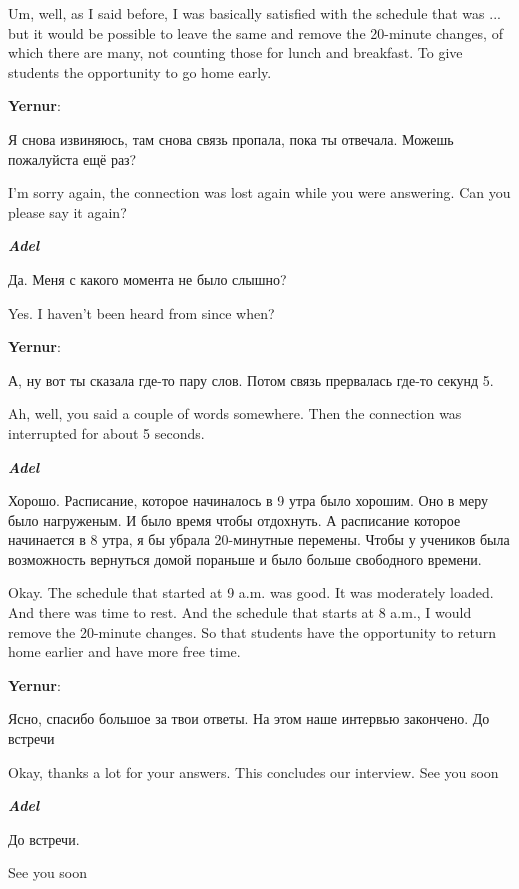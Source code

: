 Um, well, as I said before, I was basically satisfied with the schedule that was ... but it would be possible to leave the same and remove the 20-minute changes, of which there are many, not counting those for lunch and breakfast. To give students the opportunity to go home early.

\textbf{Yernur}: 

Я снова извиняюсь, там снова связь пропала, пока ты отвечала. Можешь пожалуйста ещё раз?

I'm sorry again, the connection was lost again while you were answering. Can you please say it again?

\textbf{\textit{Adel}}

Да. Меня с какого момента не было слышно? 

Yes. I haven't been heard from since when?

\textbf{Yernur}: 

А, ну вот ты сказала где-то пару слов. Потом связь прервалась где-то секунд 5. 

Ah, well, you said a couple of words somewhere. Then the connection was interrupted for about 5 seconds.

\textbf{\textit{Adel}}

Хорошо. Расписание, которое начиналось в 9 утра было хорошим. Оно в меру было нагруженым. И было время чтобы отдохнуть. А расписание которое начинается в 8 утра, я бы убрала 20-минутные перемены. Чтобы у учеников была возможность вернуться домой пораньше и было больше свободного времени. 

Okay. The schedule that started at 9 a.m. was good. It was moderately loaded. And there was time to rest. And the schedule that starts at 8 a.m., I would remove the 20-minute changes. So that students have the opportunity to return home earlier and have more free time.

\textbf{Yernur}: 

Ясно, спасибо большое за твои ответы. На этом наше интервью закончено. До встречи

Okay, thanks a lot for your answers. This concludes our interview. See you soon

\textbf{\textit{Adel}}

До встречи.

See you soon